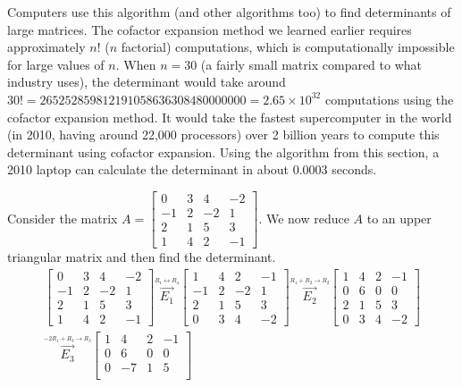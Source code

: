 Computers use this algorithm (and other algorithms too) to find determinants of large matrices.  The cofactor expansion method we learned earlier requires approximately $n!$ ($n$ factorial) computations, which is computationally impossible for large values of $n$. When $n=30$ (a fairly small matrix compared to what industry uses), the determinant would take around $30!=265252859812191058636308480000000 = 2.65\times 10^{32}$ computations using the cofactor expansion method.  It would take the fastest supercomputer in the world (in 2010, having around 22,000 processors) over 2 billion years to compute this determinant using cofactor expansion.  Using the algorithm from this section, a 2010 laptop can calculate the determinant in about 0.0003 seconds.

\begin{example}
Consider the matrix $A=
\begin{bmatrix}
 0 & 3 & 4 & -2 \\
 -1 & 2 & -2 & 1 \\
 2 & 1 & 5 & 3 \\
 1 & 4 & 2 & -1
\end{bmatrix}$.  
We now reduce $A$ to an upper triangular matrix and then find the determinant.  
\begin{align*}
\begin{bmatrix}
 0 & 3 & 4 & -2 \\
 -1 & 2 & -2 & 1 \\
 2 & 1 & 5 & 3 \\
 1 & 4 & 2 & -1
\end{bmatrix}
\stackrel{\xrightarrow{R_1\leftrightarrow R_4}}{E_1}
\begin{bmatrix}
 1 & 4 & 2 & -1\\
 -1 & 2 & -2 & 1 \\
 2 & 1 & 5 & 3 \\
 0 & 3 & 4 & -2 
\end{bmatrix}
\stackrel{\xrightarrow{R_1+R_2\to R_2}}{E_2}
\begin{bmatrix}
 1 & 4 & 2 & -1\\
 0 & 6 & 0 & 0 \\
 2 & 1 & 5 & 3 \\
 0 & 3 & 4 & -2 
\end{bmatrix}
\\
\stackrel{\xrightarrow{-2R_1+R_3\to R_3}}{E_3}
\begin{bmatrix}
 1 & 4 & 2 & -1\\
 0 & 6 & 0 & 0 \\
 0 & -7 & 1 & 5 \\

\end{bmatrix}
\end{align*}
\end{example}
